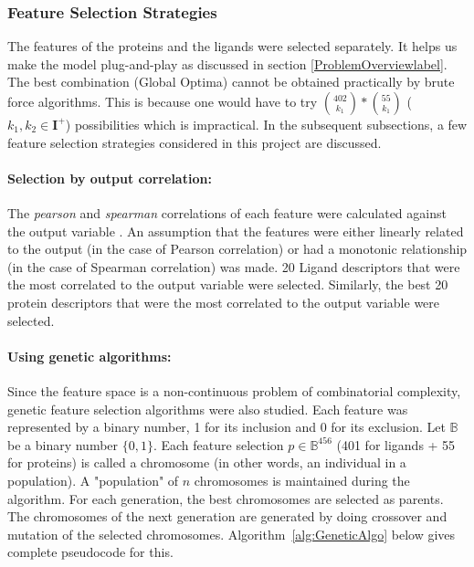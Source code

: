 \documentclass[11pt]{article}
\begin{document}
\subsubsection{Feature Selection Strategies}


The features of the proteins and the ligands were selected separately.
It helps us make the model plug-and-play as discussed in section \ref{ProblemOverviewlabel}.
The best combination (Global Optima) cannot be obtained practically by brute force algorithms.
This is because one would have to try $\binom{402}{k_1} * \binom{55}{k_1}$ ($k_1, k_2 \in \mathbf{I}^+$) possibilities which is impractical.
In the subsequent subsections, a few feature selection strategies considered in this project are discussed.

\paragraph{Selection by output correlation:}
The \textit{pearson} and \textit{spearman} correlations of each feature were calculated against the output variable \cite{spearmanpearsoncorrelation}.
An assumption that the features were either linearly related to the output (in the case of Pearson correlation) or had a monotonic relationship (in the case of Spearman correlation) was made.
20 Ligand descriptors that were the most correlated to the output variable were selected.  Similarly, the best 20 protein descriptors that were the most correlated to the output variable were selected.

\paragraph{Using genetic algorithms:}
\label{geneticalgorithmssection}
Since the feature space is a non-continuous problem of combinatorial complexity, genetic feature selection algorithms \cite{geneticalgorithmsresearchpaper} \cite{genetic_algorithm} were also studied.
Each feature was represented by a binary number, 1 for its inclusion and 0 for its exclusion.
Let $\mathbb{B}$ be a binary number $\{0,  1\}$.
Each feature selection $p \in \mathbb{B}^{456}$ (401 for ligands + 55 for proteins) is called a chromosome (in other words, an individual in a population).
A "population" of $n$ chromosomes is maintained during the algorithm.
For each generation,  the best chromosomes are selected as parents.
The chromosomes of the next generation are generated by doing crossover and mutation of the selected chromosomes.
Algorithm~\ref{alg:GeneticAlgo} below gives complete pseudocode for this.
\end{document}
